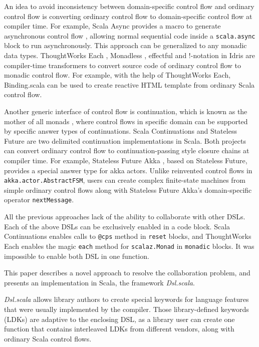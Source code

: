 An idea to avoid inconsistency between domain-specific control flow and ordinary control flow is converting ordinary control flow to domain-specific control flow at compiler time. For example, Scala Async provides a macro to generate asynchronous control flow \cite{haller2013sip}, allowing normal sequential code inside a \lstinline{scala.async} block to run asynchronously. This approach can be generalized to any monadic data types. ThoughtWorks Each \cite{yangbo2015each}, Monadless \cite{flavio2017monadless}, effectful \cite{crockett2013effectful} and !-notation in Idris \cite{brady2013idris} are compiler-time transformers to convert source code of ordinary control flow to monadic control flow. For example, with the help of ThoughtWorks Each, Binding.scala\cite{yangbo2016binding} can be used to create reactive HTML template from ordinary Scala control flow.

Another generic interface of control flow is continuation, which is known as the mother of all monads \cite{piponi2008mother}, where control flows in specific domain can be supported by specific answer types of continuations. Scala Continuations \cite{rompf2009implementing} and Stateless Future \cite{yangbo2014stateless} are two delimited continuation implementations in Scala. Both projects can convert ordinary control flow to continuation-passing style closure chains at compiler time. For example, Stateless Future Akka \cite{yangbo2014statelessfutureakka}, based on Stateless Future, provides a special answer type for akka actors. Unlike reinvented control flows in \lstinline{akka.actor.AbstractFSM}, users can create complex finite-state machines from simple ordinary control flows along with Stateless Future Akka's domain-specific operator \lstinline{nextMessage}.

All the previous approaches lack of the ability to collaborate with other DSLs. Each of the above DSLs can be exclusively enabled in a code block. Scala Continuations enables calls to \lstinline{@cps} method in \lstinline{reset} blocks, and ThoughtWorks Each enables the magic \lstinline{each} method \cite{yangbo2015each} for \lstinline{scalaz.Monad} in \lstinline{monadic} blocks. It was impossible to enable both DSL in one function.

This paper describes a novel approach to resolve the collaboration problem, and presents an implementation in Scala, the framework \textit{Dsl.scala}.

\textit{Dsl.scala} allows library authors to create special keywords for language features that were usually implemented by the compiler. Those library-defined keywords (LDKs) are adaptive to the enclosing DSL, as a library user can create one function that contains interleaved LDKs from different vendors, along with ordinary Scala control flows.

